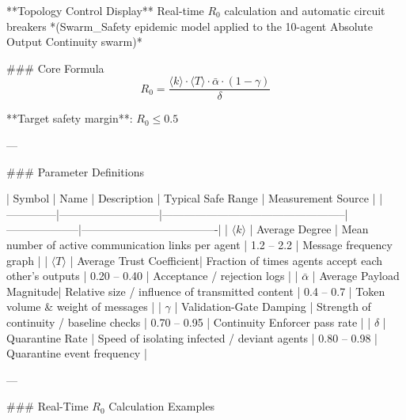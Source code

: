 **Topology Control Display**  
Real-time \( R_0 \) calculation and automatic circuit breakers  
*(Swarm_Safety epidemic model applied to the 10-agent Absolute Output Continuity swarm)*

### Core Formula
\[
R_0 = \frac{\langle k \rangle \cdot \langle T \rangle \cdot \bar{\alpha} \cdot (1 - \gamma)}{\delta}
\]

**Target safety margin**: \( R_0 \le 0.5 \)

---

### Parameter Definitions

| Symbol       | Name                      | Description                                      | Typical Safe Range | Measurement Source                  |
|--------------|---------------------------|--------------------------------------------------|--------------------|-------------------------------------|
| \(\langle k \rangle\) | Average Degree           | Mean number of active communication links per agent | 1.2 – 2.2         | Message frequency graph            |
| \(\langle T \rangle\) | Average Trust Coefficient| Fraction of times agents accept each other’s outputs | 0.20 – 0.40      | Acceptance / rejection logs        |
| \(\bar{\alpha}\)     | Average Payload Magnitude| Relative size / influence of transmitted content  | 0.4 – 0.7         | Token volume & weight of messages  |
| \(\gamma\)           | Validation-Gate Damping  | Strength of continuity / baseline checks          | 0.70 – 0.95       | Continuity Enforcer pass rate      |
| \(\delta\)           | Quarantine Rate          | Speed of isolating infected / deviant agents      | 0.80 – 0.98       | Quarantine event frequency         |

---

### Real-Time \( R_0 \) Calculation Examples

